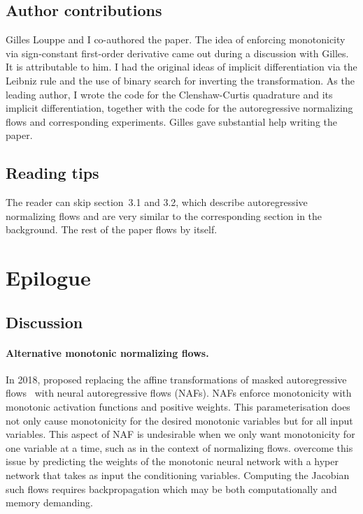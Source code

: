 \subsection{Author contributions}
Gilles Louppe and I co-authored the paper. The idea of enforcing monotonicity via sign-constant first-order derivative came out during a discussion with Gilles. It is attributable to him. I had the original ideas of implicit differentiation via the Leibniz rule and the use of binary search for inverting the transformation. As the leading author, I wrote the code for the Clenshaw-Curtis quadrature and its implicit differentiation, together with the code for the autoregressive normalizing flows and corresponding experiments. Gilles gave substantial help writing the paper.

\subsection{Reading tips}
The reader can skip section~3.1 and 3.2, which describe autoregressive normalizing flows and are very similar to the corresponding section in the background. The rest of the paper flows by itself.



\section{Epilogue} \label{epi:ch05}
\subsection{Discussion}
\paragraph{Alternative monotonic normalizing flows.}
In 2018, \citet{huang_neural_2018} proposed replacing the affine transformations of masked autoregressive flows~\citep{papamakarios_masked_2017} with neural autoregressive flows (NAFs). NAFs enforce monotonicity with monotonic activation functions and positive weights. This parameterisation does not only cause monotonicity for the desired monotonic variables but for all input variables. This aspect of NAF is undesirable when we only want monotonicity for one variable at a time, such as in the context of normalizing flows. \citet{huang_neural_2018} overcome this issue by predicting the weights of the monotonic neural network with a hyper network that takes as input the conditioning variables. Computing the Jacobian such flows requires backpropagation which may be both computationally and memory demanding.

